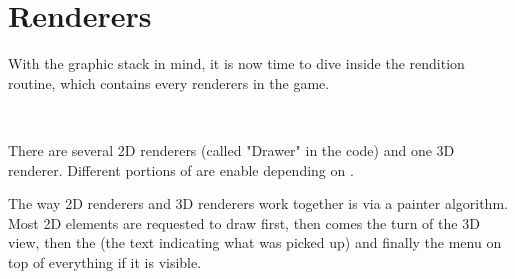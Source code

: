 \section{Renderers}
With the graphic stack in mind, it is now time to dive inside the rendition routine,  which contains every renderers in the game.\\
\par
{}\\
\par
 There are several 2D renderers (called "Drawer" in the code) and one 3D renderer. Different portions of  are enable depending on .\\
 \par
  The way 2D renderers and 3D renderers work together is via a painter algorithm. Most 2D elements are requested to draw first, then comes the turn of the 3D view, then the  (the text indicating what was picked up) and finally the menu on top of everything if it is visible.\\
